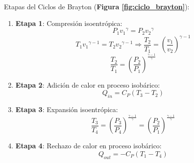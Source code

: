             Etapas del Ciclos de Brayton (\textbf{Figura \ref{fig:ciclo_brayton}}):
            
            \begin{enumerate}
                \item \textbf{Etapa 1}: Compresión isoentrópica:
                \[P_{1}{v_{1}}^{\gamma}=P_{2}{v_{2}}^{\gamma}\]
                \[T_{1}{v_{1}}^{\gamma - 1}=T_{2}{v_{2}}^{\gamma - 1} \Rightarrow \frac{T_{2}}{T_{1}}=\left ( \frac{v_{1}}{v_{2}} \right )^{\gamma - 1}\]
                \[\frac{T_{2}}{T_{1}}=\left ( \frac{P_{2}}{P_{1}} \right )^{\frac{\gamma - 1}{\gamma}}\]
                
                \item \textbf{Etapa 2}: Adición de calor en proceso isobárico:
                \[Q_{in}=C_{P}(T_{3}-T_{2})\]
                
                \item \textbf{Etapa 3}: Expansión isoentrópica:
                \[\frac{T_{3}}{T_{4}}=\left ( \frac{P_{3}}{P_{4}} \right )^{\frac{\gamma - 1}{\gamma}}=\left ( \frac{P_{2}}{P_{1}} \right )^{\frac{\gamma-1}{\gamma}}\]
                
                \item \textbf{Etapa 4}: Rechazo de calor en proceso isobárico:
                \[Q_{out}=-C_{P}(T_{1} -T_{4})\]
            \end{enumerate}
            
